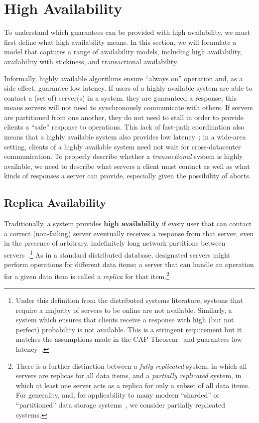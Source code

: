 
\section{High Availability}
\label{sec:availability}

To understand which guarantees can be provided with high availability,
we must first define what high availability means. In this section, we
will formulate a model that captures a range of availability models,
including high availability, availability with stickiness, and
transactional availability.

Informally, highly available algorithms ensure ``always on'' operation
and, as a side effect, guarantee low latency. If users of a highly
available system are able to contact a (set of) server(s) in a system,
they are guaranteed a response; this means servers will not need to
synchronously communicate with others. If servers are partitioned from one
another, they do not need to stall in order to provide clients a
``safe'' response to operations. This lack of fast-path coordination
also means that a highly available system also provides low
latency~\cite{abadi-pacelc}; in a wide-area setting, clients of a
highly available system need not wait for cross-datacenter
communication. To properly describe whether a \textit{transactional}
system is highly available, we need to describe what servers a client
must contact as well as what kinds of responses a server can provide,
especially given the possibility of aborts.

\subsection{Replica Availability}

Traditionally, a system provides {\textbf{high availability}} if every
user that can contact a correct (non-failing) server eventually
receives a response from that server, even in the presence of
arbitrary, indefinitely long network partitions between
servers~\cite{gilbert-cap}.\footnote{Under this definition from the
  distributed systems literature, systems that require a majority of
  servers to be online are not available. Similarly, a system which
  ensures that clients receive a response with high (but not perfect)
  probability is not available. This is a stringent requirement but it
  matches the assumptions made in the CAP Theorem~\cite{gilbert-cap}
  and guarantees low latency~\cite{abadi-pacelc}.} As in a standard
distributed database, designated servers might perform operations for
different data items; a server that can handle an operation for a
given data item is called a \textit{replica} for that
item.\footnote{There is a further distinction between a \textit{fully
    replicated} system, in which all servers are replicas for all data
  items, and a \textit{partially replicated} system, in which at least
  one server acts as a replica for only a subset of all data
  items. For generality, and, for applicability to many modern
  ``sharded'' or ``partitioned'' data storage systems~\cite{ bigtable,
    pnuts, spanner, dynamo, hstore}, we consider partially replicated
  systems.}

